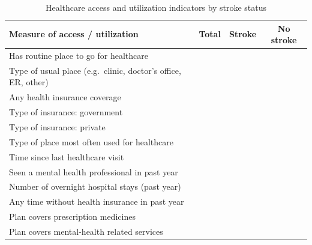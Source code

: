 \documentclass{article}
\begin{document}
\begin{table}[htbp]
\centering
\caption{Healthcare access and utilization indicators by stroke status}
\label{tab:access-stroke}
\begin{tabular}{lccc}
\hline
\textbf{Measure of access / utilization} & \textbf{Total} & \textbf{Stroke} & \textbf{No stroke} \\
\hline
Has routine place to go for healthcare & & & \\
Type of usual place (e.g.\ clinic, doctor's office, ER, other) & & & \\
Any health insurance coverage & & & \\
Type of insurance: government & & & \\
Type of insurance: private & & & \\
Type of place most often used for healthcare & & & \\
Time since last healthcare visit & & & \\
Seen a mental health professional in past year & & & \\
Number of overnight hospital stays (past year) & & & \\
Any time without health insurance in past year & & & \\
Plan covers prescription medicines & & & \\
Plan covers mental-health related services & & & \\
\hline
\end{tabular}
\end{table}


\end{document}
